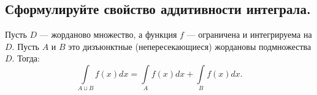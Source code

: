 \subsection{Сформулируйте свойство аддитивности интеграла.}

\begin{theorem*}
    Пусть $D$ --- жорданово множество, а функция $f$ --- ограничена и интегрируема на $D$. Пусть $A$ и $B$ это дизъюнктные (непересекающиеся) жордановы подмножества $D$. Тогда:
    \begin{equation*}
        \underset{A \sqcup B}{\int} f(x) dx = \underset{A}{\int} f(x) dx + \underset{B}{\int} f(x) dx.
    \end{equation*}
\end{theorem*}
